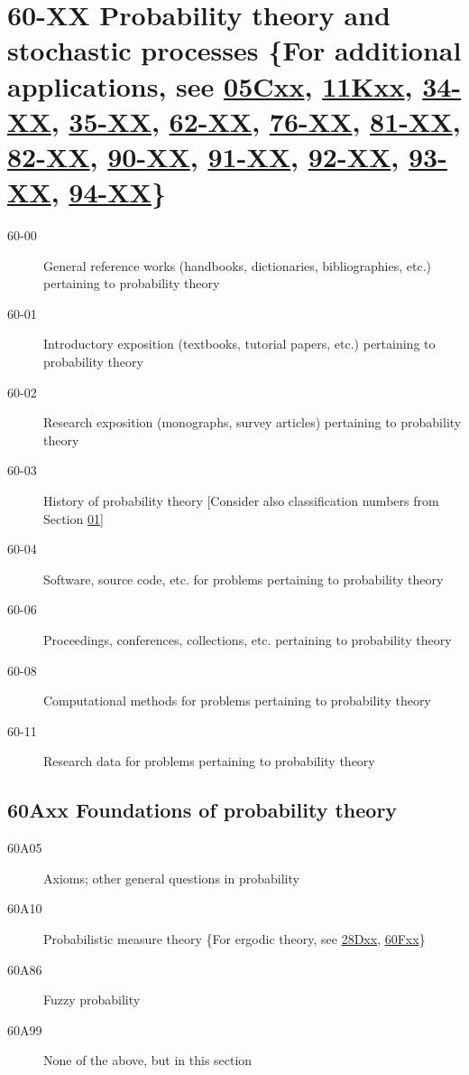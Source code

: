 \documentclass[letterpaper]{article}
\begin{document}
\section*{60-XX Probability theory and stochastic processes \{For additional applications, see \hyperref[05Cxx]{05Cxx}, \hyperref[11Kxx]{11Kxx}, \hyperref[34-XX]{34-XX}, \hyperref[35-XX]{35-XX}, \hyperref[62-XX]{62-XX}, \hyperref[76-XX]{76-XX}, \hyperref[81-XX]{81-XX}, \hyperref[82-XX]{82-XX}, \hyperref[90-XX]{90-XX}, \hyperref[91-XX]{91-XX}, \hyperref[92-XX]{92-XX}, \hyperref[93-XX]{93-XX}, \hyperref[94-XX]{94-XX}\} }\label{60-XX}
\begin{description}
\item [60-00]\label{60-00} General reference works (handbooks, dictionaries, bibliographies, etc.) pertaining to probability theory
\item [60-01]\label{60-01} Introductory exposition (textbooks, tutorial papers, etc.) pertaining to probability theory
\item [60-02]\label{60-02} Research exposition (monographs, survey articles) pertaining to probability theory
\item [60-03]\label{60-03} History of probability theory [Consider also classification numbers from Section \hyperref[01-XX]{01}]
\item [60-04]\label{60-04} Software, source code, etc. for problems pertaining to probability theory
\item [60-06]\label{60-06} Proceedings, conferences, collections, etc. pertaining to probability theory
\item [60-08]\label{60-08} Computational methods for problems pertaining to probability theory
\item [60-11]\label{60-11} Research data for problems pertaining to probability theory
\end{description}
\subsection*{60Axx  Foundations of probability theory }\label{60Axx}
\begin{description}  
\item [60A05]\label{60A05} Axioms; other general questions in probability
\item [60A10]\label{60A10} Probabilistic measure theory \{For ergodic theory, see \hyperref[28Dxx]{28Dxx}, \hyperref[60Fxx]{60Fxx}\}
\item [60A86]\label{60A86} Fuzzy probability
\item [60A99]\label{60A99} None of the above, but in this section
\end{description}
\end{document}
